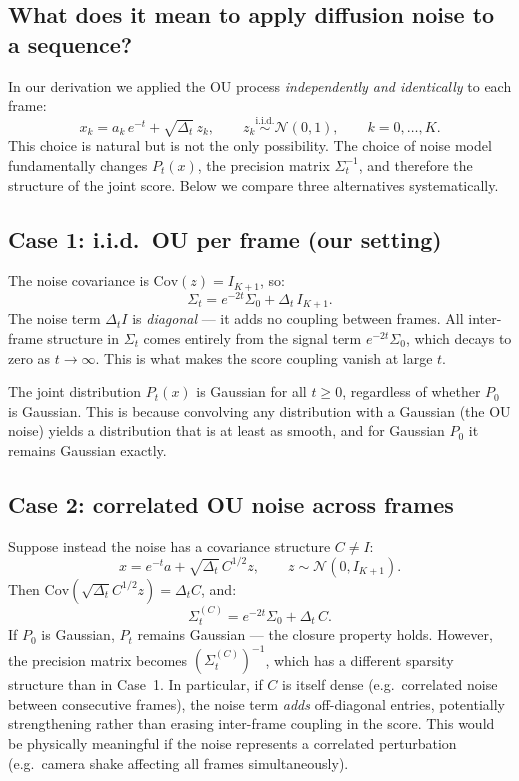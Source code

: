 \documentclass[12pt, a4paper]{article}
\def\ba{a}%
\def\bx{x}%
\def\bm#1{#1}%
\theoremstyle{definition}
\newcommand{\N}{\mathcal{N}}
\newcommand{\ba}{\bm{a}}
\newcommand{\bx}{\bm{x}}
\newcommand{\bz}{\bm{z}}
\newcommand{\dt}{\Delta_t}
\begin{document}
\subsection{What does it mean to apply diffusion noise to a sequence?}

In our derivation we applied the OU process \emph{independently and
identically} to each frame:
\[
  x_k = a_k\,e^{-t} + \sqrt{\dt}\,z_k,
  \qquad z_k \overset{\mathrm{i.i.d.}}{\sim} \N(0,1),
  \qquad k = 0,\ldots,K.
\]
This choice is natural but is not the only possibility. The choice of
noise model fundamentally changes $P_t(\bx)$, the precision matrix
$\Sigma_t^{-1}$, and therefore the structure of the joint score.
Below we compare three alternatives systematically.

\subsection{Case 1: i.i.d.\ OU per frame (our setting)}

The noise covariance is $\text{Cov}(\bm{z}) = I_{K+1}$, so:
\[
  \Sigma_t = e^{-2t}\Sigma_0 + \dt\,I_{K+1}.
\]
The noise term $\dt I$ is \emph{diagonal} — it adds no coupling between
frames. All inter-frame structure in $\Sigma_t$ comes entirely from the
signal term $e^{-2t}\Sigma_0$, which decays to zero as $t\to\infty$.
This is what makes the score coupling vanish at large $t$.

The joint distribution $P_t(\bx)$ is Gaussian for all $t \geq 0$,
regardless of whether $P_0$ is Gaussian. This is because convolving
any distribution with a Gaussian (the OU noise) yields a distribution
that is at least as smooth, and for Gaussian $P_0$ it remains Gaussian
exactly.

\subsection{Case 2: correlated OU noise across frames}

Suppose instead the noise has a covariance structure $C \neq I$:
\[
  \bx = e^{-t}\ba + \sqrt{\dt}\,C^{1/2}\bz,
  \qquad \bz \sim \N(\bm{0}, I_{K+1}).
\]
Then $\text{Cov}(\sqrt{\dt}C^{1/2}\bz) = \dt C$, and:
\[
  \Sigma_t^{(C)} = e^{-2t}\Sigma_0 + \dt\,C.
\]
If $P_0$ is Gaussian, $P_t$ remains Gaussian — the closure property
holds. However, the precision matrix becomes
$(\Sigma_t^{(C)})^{-1}$, which has a different sparsity structure than
in Case~1. In particular, if $C$ is itself dense (e.g.\ correlated
noise between consecutive frames), the noise term \emph{adds}
off-diagonal entries, potentially strengthening rather than erasing
inter-frame coupling in the score. This would be physically meaningful
if the noise represents a correlated perturbation (e.g.\ camera shake
affecting all frames simultaneously).
\end{document}

